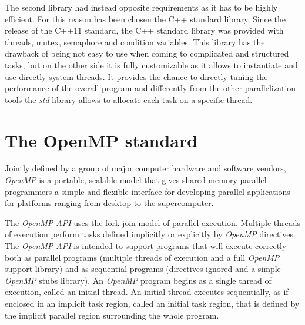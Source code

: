 \documentclass[a4paper,11pt,oneside]{book}
\begin{document}
The second library had instead opposite requirements as it has to be highly efficient. For this reason has been chosen the C++ standard library. Since the release of the C++11 standard, the C++ standard library was provided with threads, mutex, semaphore and condition variables. This library has the drawback of being not easy to use when coming to complicated and structured tasks, but on the other side it is fully customizable as it allows to instantiate and use directly system threads. It provides the chance to directly tuning the performance of the overall program and differently from the other parallelization tools the \emph{std} library allows to allocate each task on a specific thread.

\section{The OpenMP standard}
\label{openmp}

Jointly defined by a group of major computer hardware and software vendors, \emph{OpenMP} is a portable, scalable model that gives shared-memory parallel programmers a simple and flexible interface for developing parallel applications for platforms ranging from desktop to the supercomputer.

The \emph{OpenMP API} uses the fork-join model of parallel execution. Multiple threads of execution perform tasks defined implicitly or explicitly by \emph{OpenMP} directives. The \emph{OpenMP API} is intended to support programs that will execute correctly both as parallel programs (multiple threads of execution and a full \emph{OpenMP} support library) and as sequential programs (directives ignored and a simple \emph{OpenMP} stubs library).
An \emph{OpenMP} program begins as a single thread of execution, called an initial thread. An initial thread executes sequentially, as if enclosed in an implicit task region, called an initial task region, that is defined by the implicit parallel region surrounding the whole program.
\end{document}
